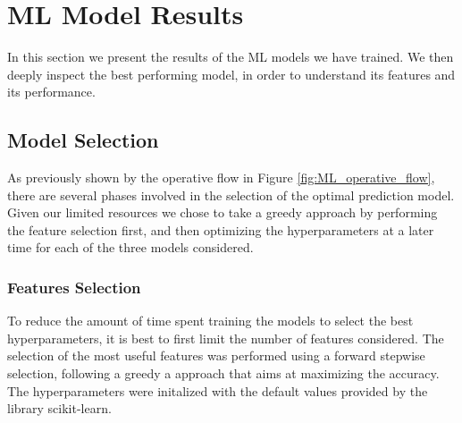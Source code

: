 \section{ML Model Results}
\label{sec:results_ML}
In this section we present the results of the ML models we have trained. We then deeply inspect the best performing model, 
in order to understand its features and its performance.



\subsection{Model Selection}
\label{subsec:results_ML_model_selection}
As previously shown by the operative flow in Figure \ref{fig:ML_operative_flow}, there are several phases involved in the selection of the optimal prediction model. Given our limited resources we chose to take a greedy approach by performing the feature selection first, and then optimizing the hyperparameters at a later time for each of the three models considered.
\subsubsection*{Features Selection}
To reduce the amount of time spent training the models to select the best hyperparameters, it is best to first limit the number of features considered. The selection of the most useful features was performed using a forward stepwise selection, following a greedy a approach that aims at maximizing the accuracy. The hyperparameters were initalized with the default values provided by the library scikit-learn.

